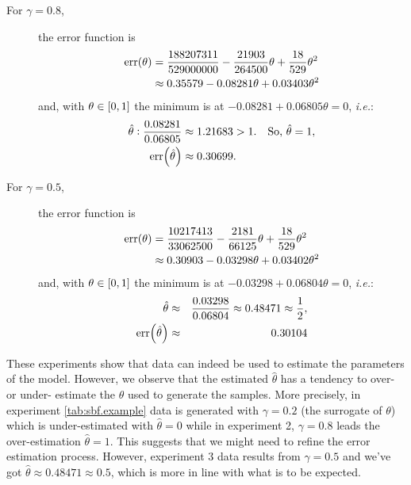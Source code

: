 \documentclass[adraft,copyright,creativecommons]{eptcs}
\newcommand{\at}[1]{\ensuremath{\!\del{#1}}}
\newcommand{\err}[1]{\ensuremath{\mathrm{err}\at{#1}}}
\begin{document}
\begin{description}
    \item[For $\gamma=0.8$,] the error function is
          \begin{align*}
              \err{\theta} &= \frac{188207311}{529000000} - \frac{21903}{264500} \theta + \frac{18}{529} \theta^{2} \\
               &\approx 0.35579 - 0.08281 \theta + 0.03403 \theta ^2
          \end{align*}
          and, with $\theta\in\intcc{0, 1}$ the minimum is at $-0.08281 + 0.06805 \theta = 0$, \emph{i.e.}:
          \begin{eqnarray*}
              \hat{\theta} :              \frac{0.08281}{0.06805} \approx 1.21683& >1. &\text{So,~} \hat{\theta} = 1, \\
              \err{\hat{\theta}} \approx  0.30699&.
          \end{eqnarray*}

    \item[For $\gamma=0.5$,] the error function is
          \begin{align*}
              \err{\theta} &= \frac{10217413}{33062500} - \frac{2181}{66125} \theta + \frac{18}{529} \theta^{2} \\
              & \approx 0.30903 - 0.03298 \theta + 0.03402 \theta ^2
          \end{align*}
          and, with $\theta\in\intcc{0, 1}$ the minimum is at $-0.03298 + 0.06804 \theta = 0$, \emph{i.e.}:
          \begin{eqnarray*}
              \hat{\theta}        &\approx &
              \frac{0.03298}{0.06804}
              \approx 0.48471
              \approx \frac{1}{2}, \\
              \err{\hat{\theta}}  &\approx &
              0.30104
          \end{eqnarray*}

\end{description}

These experiments show that data can indeed be used to estimate the parameters of the model. However, we observe that the estimated $\hat{\theta}$ has a tendency to  over- or under- estimate the $\theta$ used to generate the samples. More precisely, in experiment \ref{tab:sbf.example} data is generated with $\gamma = 0.2$ (the surrogate of $\theta$) which is under-estimated with $\hat{\theta} = 0$ while in experiment 2, $\gamma = 0.8$ leads the over-estimation $\hat{\theta} = 1$. This suggests that we might need to refine the error estimation process. However, experiment 3 data results from $\gamma = 0.5$ and we've got $\hat{\theta} \approx 0.48471 \approx 0.5$, which is more in line with what is to be expected.
%
%
%
\end{document}

